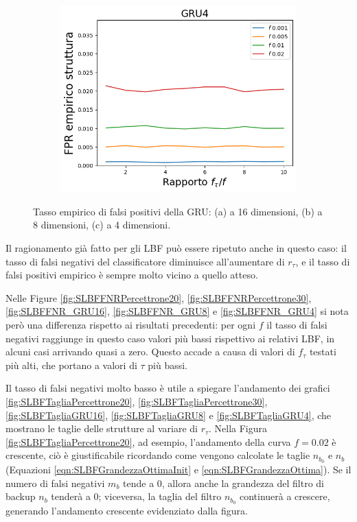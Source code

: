 \documentclass[../../main.tex]{subfiles}
\begin{document}
\begin{figure}[H]
        \begin{subfigure}[b]{0.49\textwidth}
            \centering
            \includegraphics[width = \textwidth]{immagini/7/SLBF/GRU4_FPR.png}
            \caption{}
            \label{fig:SLBFFPR_GRU4}
        \end{subfigure}
        \caption{Tasso empirico di falsi positivi della GRU: (a) a 16 dimensioni, (b) a 8 dimensioni, (c) a 4 dimensioni.}
        \label{fig:SLBFFPR_GRU}
    \end{figure}

    Il ragionamento già fatto per gli LBF può essere ripetuto anche in questo caso: il tasso di falsi negativi del classificatore diminuisce all'aumentare di $r_{\tau}$, e il tasso di falsi positivi empirico è sempre molto vicino a quello atteso.

    Nelle Figure \ref{fig:SLBFFNRPercettrone20}, \ref{fig:SLBFFNRPercettrone30}, \ref{fig:SLBFFNR_GRU16}, \ref{fig:SLBFFNR_GRU8} e \ref{fig:SLBFFNR_GRU4} si nota però una differenza rispetto ai risultati precedenti: per ogni $f$ il tasso di falsi negativi raggiunge in questo caso valori più bassi rispettivo ai relativi LBF, in alcuni casi arrivando quasi a zero. Questo accade a causa di valori di $f_\tau$ testati più alti, che portano a valori di $\tau$ più bassi.

    Il tasso di falsi negativi molto basso è utile a spiegare l'andamento dei grafici \ref{fig:SLBFTagliaPercettrone20}, \ref{fig:SLBFTagliaPercettrone30}, \ref{fig:SLBFTagliaGRU16}, \ref{fig:SLBFTagliaGRU8} e \ref{fig:SLBFTagliaGRU4}, che mostrano le taglie delle strutture al variare di $r_\tau$. Nella Figura \ref{fig:SLBFTagliaPercettrone20}, ad esempio, l'andamento della curva $f = 0.02$ è crescente, ciò è giustificabile ricordando come vengono calcolate le taglie $n_{b_0}$ e $n_b$ (Equazioni \eqref{eqn:SLBFGrandezzaOttimaInit} e \eqref{eqn:SLBFGrandezzaOttima}). Se il numero di falsi negativi $m_b$ tende a 0, allora anche la grandezza del filtro di backup $n_b$ tenderà a 0; viceversa, la taglia del filtro $n_{b_0}$ continuerà a crescere, generando l'andamento crescente evidenziato dalla figura.
\end{document}
